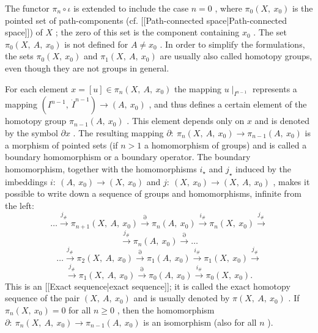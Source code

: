 The functor $  \pi _{n} \circ \iota $ 
is extended to include the case $  n = 0 $ , 
where $  \pi _{0} ( X ,\  x _{0} ) $ 
is the pointed set of path-components (cf. [[Path-connected space|Path-connected space]]) of $  X $ ; 
the zero of this set is the component containing $  x _{0} $ . 
The set $  \pi _{0} ( X ,\  A ,\  x _{0} ) $ 
is not defined for $  A \neq x _{0} $ . 
In order to simplify the formulations, the sets $  \pi _{0} ( X ,\  x _{0} ) $ 
and $  \pi _{1} ( X ,\  A ,\  x _{0} ) $ 
are usually also called homotopy groups, even though they are not groups in general.

For each element $  x = [ u ] \in \pi _{n} ( X ,\  A ,\  x _{0} ) $ 
the mapping $  u \mid _ {I ^{n-1}} $ 
represents a mapping $  ( I ^{n-1} ,\  \dot{I}  ^{n-1} ) \rightarrow ( A ,\  x _{0} ) $ , 
and thus defines a certain element of the homotopy group $  \pi _{n-1} ( A ,\  x _{0} ) $ . 
This element depends only on $  x $ 
and is denoted by the symbol $  \partial x $ . 
The resulting mapping $  \partial : \  \pi _{n} ( X ,\  A ,\  x _{0} ) \rightarrow \pi _{n-1} ( A ,\  x _{0} ) $ 
is a morphism of pointed sets (if $  n > 1 $ 
a homomorphism of groups) and is called a boundary homomorphism or a boundary operator. The boundary homomorphism, together with the homomorphisms $  i _ \star  $ 
and $  j _ \star  $ 
induced by the imbeddings $  i : \  ( A ,\  x _{0} ) \rightarrow ( X ,\  x _{0} ) $ 
and $  j : \  ( X ,\  x _{0} ) \rightarrow ( X ,\  A ,\  x _{0} ) $ , 
makes it possible to write down a sequence of groups and homomorphisms, infinite from the left:$$ 
{} \dots  \stackrel{ {j _{\#}}} \rightarrow     \pi _{n+1}
( X ,\  A ,\  x _{0} )    \stackrel \partial  \rightarrow     \pi _{n}
( A ,\  x _{0} )    \stackrel{ {i _{\#}}} \rightarrow    
\pi _{n} ( X ,\  x _{0} )    \stackrel{ {j _{\#}}} \rightarrow  
 $$ 
$$ 
 \stackrel{ {j _{\#}}} \rightarrow     \pi _{n} ( A ,\  x _{0} )    \stackrel \partial  \rightarrow   \dots
 $$ 
$$ 
{} \dots  \stackrel{ {j _{\#}}} \rightarrow     \pi _{2} ( X ,\  A ,\  x _{0} )    \stackrel \partial  \rightarrow     \pi _{1} ( A ,\  x _{0} )    \stackrel{ {i _{\#}}} \rightarrow  
  \pi _{1} ( X ,\  x _{0} )    \stackrel{ {j _{\#}}} \rightarrow    
 $$ 
$$ 
   \stackrel{ {j _{\#}}} \rightarrow     \pi _{1} ( X ,\  A ,\  x _{0} )    \stackrel \partial  \rightarrow     \pi _{0} ( A ,\  x _{0} )    \stackrel{ {i _{\#}}} \rightarrow     \pi _{0} ( X ,\  x _{0} ) .
 $$ 
This is an [[Exact sequence|exact sequence]]; it is called the exact homotopy sequence of the pair $  ( X ,\  A ,\  x _{0} ) $ 
and is usually denoted by $  \pi ( X ,\  A ,\  x _{0} ) $ . 
If $  \pi _{n} ( X ,\  x _{0} ) = 0 $ 
for all $  n \geq 0 $ , 
then the homomorphism $  \partial : \  \pi _{n} ( X ,\  A ,\  x _{0} ) \rightarrow \pi _{n-1} ( A ,\  x _{0} ) $ 
is an isomorphism (also for all $  n $ ).


